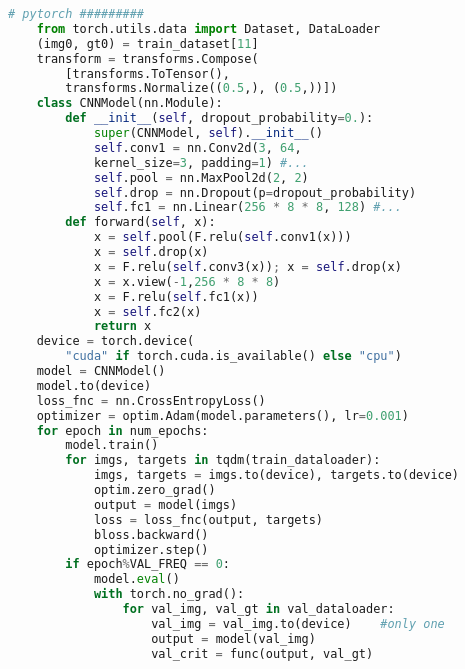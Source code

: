 {\begin{lstlisting}[language=Python]
    # pytorch #########
    from torch.utils.data import Dataset, DataLoader
    (img0, gt0) = train_dataset[11]
    transform = transforms.Compose(
        [transforms.ToTensor(), 
        transforms.Normalize((0.5,), (0.5,))])
    class CNNModel(nn.Module):
        def __init__(self, dropout_probability=0.):
            super(CNNModel, self).__init__()
            self.conv1 = nn.Conv2d(3, 64, 
            kernel_size=3, padding=1) #...
            self.pool = nn.MaxPool2d(2, 2)
            self.drop = nn.Dropout(p=dropout_probability)       
            self.fc1 = nn.Linear(256 * 8 * 8, 128) #...
        def forward(self, x):
            x = self.pool(F.relu(self.conv1(x)))
            x = self.drop(x)
            x = F.relu(self.conv3(x)); x = self.drop(x)                
            x = x.view(-1,256 * 8 * 8)
            x = F.relu(self.fc1(x))
            x = self.fc2(x)          
            return x
    device = torch.device(
        "cuda" if torch.cuda.is_available() else "cpu")
    model = CNNModel()
    model.to(device)
    loss_fnc = nn.CrossEntropyLoss()
    optimizer = optim.Adam(model.parameters(), lr=0.001)  
    for epoch in num_epochs:
        model.train()
        for imgs, targets in tqdm(train_dataloader):
            imgs, targets = imgs.to(device), targets.to(device)
            optim.zero_grad()
            output = model(imgs)
            loss = loss_fnc(output, targets)
            bloss.backward()
            optimizer.step()
        if epoch%VAL_FREQ == 0:
            model.eval()
            with torch.no_grad():
                for val_img, val_gt in val_dataloader:
                    val_img = val_img.to(device)    #only one
                    output = model(val_img)
                    val_crit = func(output, val_gt)      
\end{lstlisting}
}